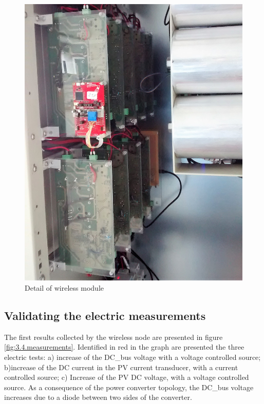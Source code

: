 \begin{figure}[!htb]
\begin{minipage}{0.45\textwidth}
		\includegraphics[width=0.98\linewidth, keepaspectratio]{figures/armario2}
		\caption{Detail of wireless module}
		\label{fig:3.4.armario2}
	\end{minipage}
\end{figure}

\subsection{Validating the electric measurements}

The first results collected by the wireless node are presented in figure \ref{fig:3.4.measurements}.
Identified in red in the graph are presented the three electric tests: a) increase of the DC\_bus voltage with a voltage controlled source; b)increase of the DC current in the PV current transducer, with a current controlled source; c) Increase of the PV DC voltage, with a voltage controlled source. As a consequence of the power converter topology, the DC\_bus voltage increases due to a diode between two sides of the converter.



